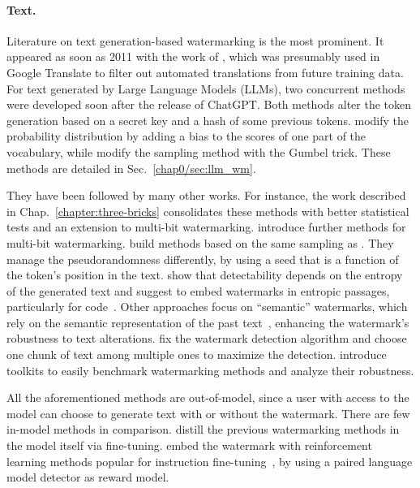 \paragraph*{Text.} 
Literature on text generation-based watermarking is the most prominent. 
It appeared as soon as 2011 with the work of \cite{venugopal2011watermarking}, which was presumably used in Google Translate to filter out automated translations from future training data.
For text generated by Large Language Models (\Glspl*{LLM}), two concurrent methods were developed soon after the release of ChatGPT.
Both methods alter the token generation based on a secret key and a hash of some previous tokens.
\cite{kirchenbauer2023watermark} modify the probability distribution by adding a bias to the scores of one part of the vocabulary, while \cite{aaronson2023watermarking} modify the sampling method with the Gumbel trick.
These methods are detailed in Sec.~\ref{chap0/sec:llm_wm}.

They have been followed by many other works.
For instance, the work described in Chap.~\ref{chapter:three-bricks} consolidates these methods with better statistical tests and an extension to multi-bit watermarking. 
\cite{yoo2023advancing, yoo2023robust, qu2024provably} introduce further methods for multi-bit watermarking.
\cite{christ2023undetectable, kuditipudi2023robust} build methods based on the same sampling as \cite{aaronson2023watermarking}. 
They manage the pseudorandomness differently, by using a seed that is a function of the token's position in the text.
\cite{christ2023undetectable, huang2023optimal} show that detectability depends on the entropy of the generated text and suggest to embed watermarks in entropic passages, particularly for code~\citep{lee2023wrote}.
Other approaches focus on ``semantic'' watermarks, which rely on the semantic representation of the past text~\citep{liu2023semantic, liu2024adaptive, fu2024watermarking, hou2023semstamp, hou2024k}, enhancing the watermark's robustness to text alterations.
\cite{giboulot2024watermax} fix the watermark detection algorithm and choose one chunk of text among multiple ones to maximize the detection.
\cite{piet2023mark, pan2024markllm} introduce toolkits to easily benchmark watermarking methods and analyze their robustness.

All the aforementioned methods are out-of-model, since a user with access to the model can choose to generate text with or without the watermark.
There are few in-model methods in comparison.
\cite{gu2023learnability} distill the previous watermarking methods in the model itself via fine-tuning.
\cite{xu2024learning} embed the watermark with reinforcement learning methods popular for instruction fine-tuning~\citep{ouyang2022training}, by using a paired language model detector as reward model.

